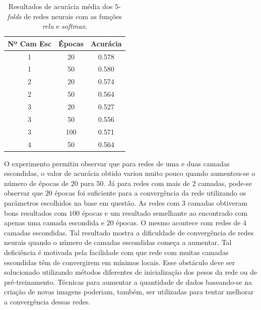 \documentclass[conference]{IEEEtran}
\begin{document}
\begin{table}[h!]
	\centering
	
	\begin{tabular}{ccc} \toprule
	\textbf{Nº Cam Esc} & \textbf{Épocas} & \textbf{Acurácia}    \\ \toprule 	
	1                              & 20              & 0.578                \\
	1                              & 50              & 0.580   				\\
	2                              & 20              & 0.574                \\
	2                              & 50              & 0.564                \\
	3                              & 20              & 0.527                \\
	3                              & 50              & 0.556                \\
	3                              & 100             & 0.571                \\
	4                              & 50              & 0.564                \\
	\bottomrule      
	\end{tabular}
	\caption{Resultados de acurácia média dos $5$-\emph{folds} de redes neurais com as funções \emph{relu} e \emph{softmax}.}
	\label{tab:misc}
\end{table}

O experimento permitiu observar que para redes de uma e duas camadas escondidas, o valor de acurácia obtido variou muito pouco quando aumentou-se o número de épocas de $20$ para $50$. Já para redes com mais de $2$ camadas, pode-se observar que $20$ épocas foi suficiente para a convergência da rede utilizando os parâmetros escolhidos na base em questão. As redes com $3$ camadas obtiveram bons resultados com $100$ épocas e um resultado semelhante ao encontrado com apenas uma camada escondida e $20$ épocas. O mesmo acontece com redes de $4$ camadas escondidas. Tal resultado mostra a dificuldade de convergência de redes neurais quando o número de camadas escondidas começa a aumentar. Tal deficiência é motivada pela facilidade com que rede com muitas camadas escondidas têm de convergirem em mínimos locais. Esse obstáculo deve ser solucionado utilizando métodos diferentes de inicialização dos pesos da rede ou de pré-treinamento. Técnicas para aumentar a quantidade de dados baseando-se na criação de novas imagens poderiam, também, ser utilizadas para tentar melhorar a convergência dessas redes.
\end{document}
